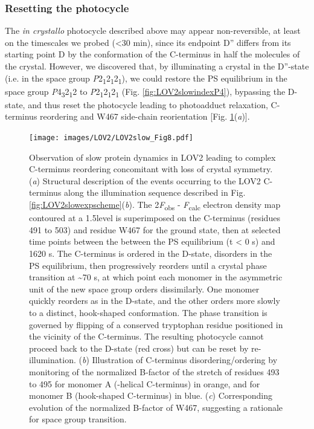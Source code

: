 \subsubsection{Resetting the photocycle}
The \textit{\textit{in crystallo}} photocycle described above may appear non-reversible, at least on the timescales we probed (<30 min), since its endpoint D'' differs from its starting point D by the conformation of the C-terminus in half the molecules of the crystal. However, we discovered that, by illuminating a crystal in the D''-state (i.e. in the space group \textit{P}2\textsubscript{1}2\textsubscript{1}2\textsubscript{1}), we could restore the PS equilibrium in the space group \textit{P}4\textsubscript{3}2\textsubscript{1}2 to \textit{P}2\textsubscript{1}2\textsubscript{1}2\textsubscript{1} (Fig. \ref{fig:LOV2slowindexP4}), bypassing the D-state, and thus reset the photocycle leading to photoadduct relaxation, C-terminus reordering and W467 side-chain reorientation [Fig. \ref{fig:LOV2slowicphotocycle}(\textit{a})].
\begin{figure}[H] %
    \centering
    \noindent \texttt{[image: images/LOV2/LOV2slow\_Fig8.pdf]}
    \hfill
    \caption{Observation of slow protein dynamics in LOV2 leading to complex C-terminus reordering concomitant with loss of crystal symmetry. (\textit{a}) Structural description of the events occurring to the LOV2 C-terminus along the illumination sequence described in Fig. \ref{fig:LOV2slowexpscheme}(\textit{b}). The 2\textit{F}\textsubscript{obs} - \textit{F}\textsubscript{calc} electron density map contoured at a 1.5\textsigma level is superimposed on the C-terminus (residues 491 to 503) and residue W467 for the ground state, then at selected time points between the between the PS equilibrium (t < 0 s) and 1620 s. The C-terminus is ordered in the D-state, disorders in the PS equilibrium, then progressively reorders until a crystal phase transition at \textasciitilde70 s, at which point each monomer in the asymmetric unit of the new space group orders dissimilarly. One monomer quickly reorders as in the D-state, and the other orders more slowly to a distinct, hook-shaped conformation. The phase transition is governed by flipping of a conserved tryptophan residue positioned in the vicinity of the C-terminus. The resulting photocycle cannot proceed back to the D-state (red cross) but can be reset by re-illumination. (\textit{b}) Illustration of C-terminus disordering/ordering by monitoring of the normalized B-factor of the stretch of residues 493 to 495 for monomer A (\textalpha-helical C-terminus) in orange, and for monomer B (hook-shaped C-terminus) in blue. (\textit{c}) Corresponding evolution of the normalized B-factor of W467, suggesting a rationale for space group transition.}
    \label{fig:LOV2slowicphotocycle}
\end{figure}

